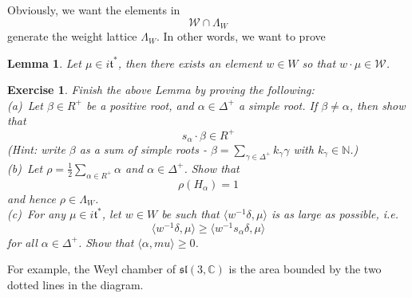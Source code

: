 \documentclass[11pt]{article}
\newtheorem{lemma}[theorem]{Lemma}
\newtheorem{exercise}[theorem]{Exercise}
\newcommand{\bb}[1]{\mathbb{#1}}
\newcommand{\mc}[1]{\mathcal{#1}}
\newcommand{\mf}[1]{\mathfrak{#1}}
\begin{document}
Obviously, we want the elements in $$\mc{W} \cap \Lambda_W$$ generate the weight lattice $\Lambda_W$. In other words, we want to prove
\begin{lemma}
Let $\mu \in i\mf{t}^*$, then there exists an element $w \in W$ so that $w \cdot \mu \in \mc{W}$.
\end{lemma}
\begin{exercise}
Finish the above Lemma by proving the following:\\
(a)\ Let $\beta \in R^+$ be a positive root, and $\alpha \in \Delta^+$ a simple root. If $\beta \neq \alpha$, then show that
$$s_{\alpha} \cdot \beta \in R^+$$
(Hint: write $\beta$ as a sum of simple roots - $\beta = \sum_{\gamma \in \Delta^+} k_{\gamma} \gamma$ with $k_{\gamma} \in \bb{N}$.)\\
(b)\ Let $\rho = \frac{1}{2}\sum_{\alpha \in R^+} \alpha$ and $\alpha \in \Delta^+$. Show that
$$\rho(H_{\alpha}) = 1$$
and hence $\rho \in \Lambda_W$.\\
(c)\  For any $\mu \in i\mf{t}^*$, let $w \in W$ be such that $\langle w^{-1}\delta, \mu \rangle$ is as large as possible, i.e.
$$\langle w^{-1}\delta, \mu \rangle \geq \langle w^{-1}s_{\alpha}\delta, \mu \rangle$$
for all $\alpha \in \Delta^+$. Show that $\langle \alpha, mu \rangle \geq 0$.
\end{exercise}
For example, the Weyl chamber of $\mf{sl}(3,\bb{C})$ is the area bounded by the two dotted lines in the diagram.
\end{document}
